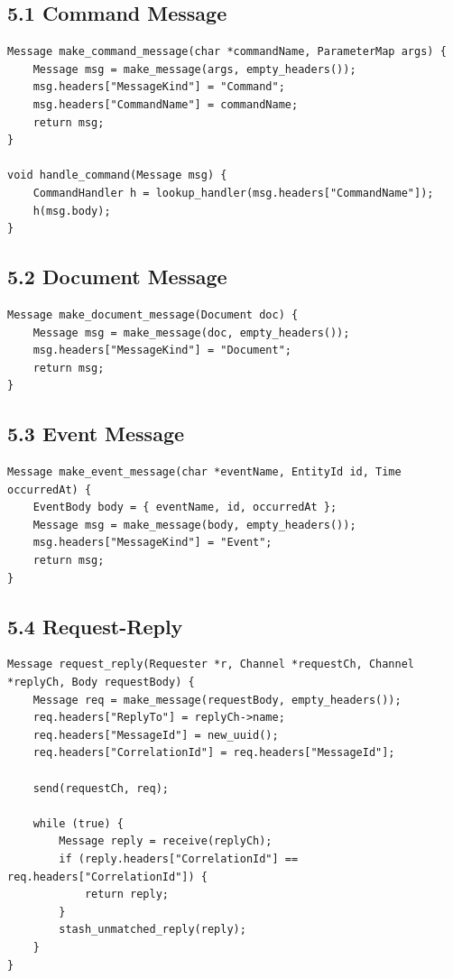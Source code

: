 \documentclass[11pt]{article}
\begin{document}
\subsection{5.1 Command Message}\label{command-message}

\begin{verbatim}
Message make_command_message(char *commandName, ParameterMap args) {
    Message msg = make_message(args, empty_headers());
    msg.headers["MessageKind"] = "Command";
    msg.headers["CommandName"] = commandName;
    return msg;
}

void handle_command(Message msg) {
    CommandHandler h = lookup_handler(msg.headers["CommandName"]);
    h(msg.body);
}
\end{verbatim}

\subsection{5.2 Document Message}\label{document-message}

\begin{verbatim}
Message make_document_message(Document doc) {
    Message msg = make_message(doc, empty_headers());
    msg.headers["MessageKind"] = "Document";
    return msg;
}
\end{verbatim}

\subsection{5.3 Event Message}\label{event-message}

\begin{verbatim}
Message make_event_message(char *eventName, EntityId id, Time occurredAt) {
    EventBody body = { eventName, id, occurredAt };
    Message msg = make_message(body, empty_headers());
    msg.headers["MessageKind"] = "Event";
    return msg;
}
\end{verbatim}

\subsection{5.4 Request-Reply}\label{request-reply}

\begin{verbatim}
Message request_reply(Requester *r, Channel *requestCh, Channel *replyCh, Body requestBody) {
    Message req = make_message(requestBody, empty_headers());
    req.headers["ReplyTo"] = replyCh->name;
    req.headers["MessageId"] = new_uuid();
    req.headers["CorrelationId"] = req.headers["MessageId"];

    send(requestCh, req);

    while (true) {
        Message reply = receive(replyCh);
        if (reply.headers["CorrelationId"] == req.headers["CorrelationId"]) {
            return reply;
        }
        stash_unmatched_reply(reply);
    }
}
\end{verbatim}
\end{document}
